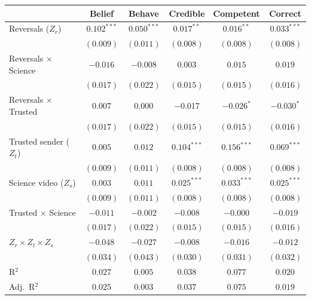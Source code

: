 
\begin{table}
\begin{center}
\begin{tabular}{l c c || c c || c}
\hline
 & Belief & Behave & Credible & Competent & Correct \\
\hline
Reversals ($Z_r$)           & $0.102^{***}$ & $0.050^{***}$ & $0.017^{**}$  & $0.016^{**}$  & $0.033^{***}$ \\
                            & $(0.009)$     & $(0.011)$     & $(0.008)$     & $(0.008)$     & $(0.008)$     \\
Reversals $\times$ Science  & $-0.016$      & $-0.008$      & $0.003$       & $0.015$       & $0.019$       \\
                            & $(0.017)$     & $(0.022)$     & $(0.015)$     & $(0.015)$     & $(0.016)$     \\
Reversals $\times$ Trusted  & $0.007$       & $0.000$       & $-0.017$      & $-0.026^{*}$  & $-0.030^{*}$  \\
                            & $(0.017)$     & $(0.022)$     & $(0.015)$     & $(0.015)$     & $(0.016)$     \\
Trusted sender ($Z_t$)      & $0.005$       & $0.012$       & $0.104^{***}$ & $0.156^{***}$ & $0.069^{***}$ \\
                            & $(0.009)$     & $(0.011)$     & $(0.008)$     & $(0.008)$     & $(0.008)$     \\
Science video ($Z_s$)       & $0.003$       & $0.011$       & $0.025^{***}$ & $0.033^{***}$ & $0.025^{***}$ \\
                            & $(0.009)$     & $(0.011)$     & $(0.008)$     & $(0.008)$     & $(0.008)$     \\
Trusted $\times$ Science    & $-0.011$      & $-0.002$      & $-0.008$      & $-0.000$      & $-0.019$      \\
                            & $(0.017)$     & $(0.022)$     & $(0.015)$     & $(0.015)$     & $(0.016)$     \\
$Z_r \times Z_t \times Z_s$ & $-0.048$      & $-0.027$      & $-0.008$      & $-0.016$      & $-0.012$      \\
                            & $(0.034)$     & $(0.043)$     & $(0.030)$     & $(0.031)$     & $(0.032)$     \\
\hline
R$^2$                       & $0.027$       & $0.005$       & $0.038$       & $0.077$       & $0.020$       \\
Adj.\ R$^2$                 & $0.025$       & $0.003$       & $0.037$       & $0.075$       & $0.019$       \\

\end{tabular}
\end{center}
\end{table}
